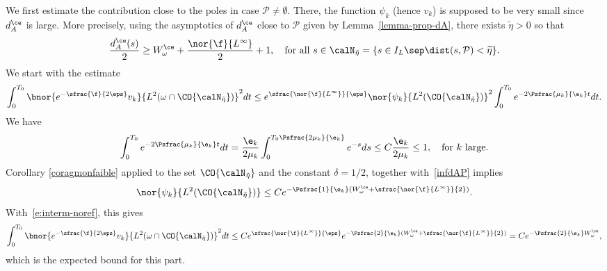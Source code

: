 We first estimate the contribution close to the poles in case $\mathcal{P}\neq \emptyset$. There, the function $\psi_k$ (hence $v_k$) is supposed to be very small since $d_A^{\ce}$ is large. More precisely, using the asymptotics of $d_A^{\ce}$ close to $\mathcal{P}$ given by Lemma~\ref{lemma-prop-dA}, there exists $\widetilde{\eta}>0$ so that%
\begin{equation}
\label{infdAP}
\frac{d_A^{\ce}(s)}{2}\geq W^{\ce}_{\omega}+\frac{\nor{\f}{L^{\infty}}}{2} +1,\quad \text{for all } s\in \calN_{\tilde{\eta}}=\{ s\in I_L \sep \dist(s,\mathcal{P}) < \widetilde{\eta}\}.
\end{equation}
We start with the estimate
\begin{equation}
\label{e:interm-noref}
\int_0^{T_0}\bnor{e^{-\sfrac{\f}{2\eps}}v_{k} }{L^2(\omega\cap\CO{\calN_{\tilde{\eta}}})}^2 dt\leq e^{\sfrac{\nor{\f}{L^{\infty}}}{\eps}} \nor{\psi_k }{L^2(\CO{\calN_{\tilde{\eta}}})}^2\int_0^{T_0}e^{-2\Psfrac{\mu_k}{\e_{k}} t} dt.
\end{equation}
We have
\[
\int_0^{T_0}e^{-2\Psfrac{\mu_k}{\e_{k}} t} dt=\frac{\e_{k}}{2\mu_k}\int_0^{ T_0\Psfrac{2\mu_k}{\e_{k}}}e^{- s} ds\leq C\frac{\e_{k}}{2\mu_k}\leq 1,\quad\text{for $k$ large.}
\]
Corollary \ref{coragmonfaible} applied to the set $\CO{\calN_{\tilde{\eta}}}$ and the constant $\delta=1/2$, together with~\eqref{infdAP} implies
\[
\nor{\psi_k }{L^2(\CO{\calN_{\tilde{\eta}}})}\leq C e^{-\Psfrac{1}{\e_k} (W^{\ce}_{\omega} +\sfrac{\nor{\f}{L^{\infty}}}{2})}.
\]
With~\eqref{e:interm-noref}, this gives
\[
\int_0^{T_0}\bnor{e^{-\sfrac{\f}{2\eps}}v_{k} }{L^2(\omega\cap \CO{\calN_{\tilde{\eta}}})}^2 dt
\leq C e^{\sfrac{\nor{\f}{L^{\infty}}}{\eps}}e^{-\Psfrac{2}{\e_k} (W^{\ce}_{\omega} +\sfrac{\nor{\f}{L^{\infty}}}{2})} = Ce^{-\Psfrac{2}{\e_k} W^{\ce}_{\omega}},
\]
which is the expected bound for this part.

